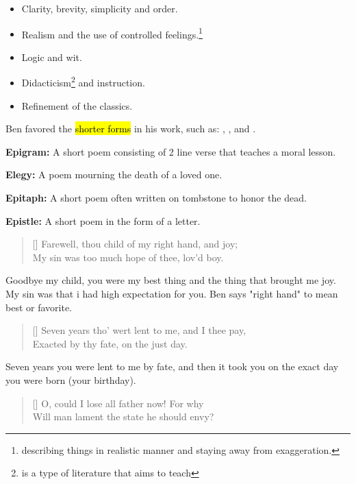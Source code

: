 
\begin{itemize}
  \item Clarity, brevity, simplicity and order.
  \item Realism and the use of controlled feelings.\footnote{describing things in realistic  manner and staying away 
    from exaggeration.}
  \item Logic and wit.
  \item Didacticism\footnote{is a type of literature that aims to teach}
    and instruction.
  \item Refinement of the classics. 
\end{itemize}


Ben favored the \hl{shorter forms} in his work, such as: 
, ,  and 
.\medbreak


\textbf{Epigram:} A short poem consisting of 2 line verse that teaches a moral lesson.\medbreak

\textbf{Elegy:} A poem mourning the death of a loved one.\medbreak

\textbf{Epitaph:} A short poem often written on tombstone
to honor the dead.\medbreak

\textbf{Epistle:} A short poem in the form of a letter.

\settowidth{\versewidth}{Farewell, thou child of my right hand, and joy}
\begin{verse}[\versewidth]
{\fontverse
Farewell, thou child of my right hand, and joy;\\
My sin was too much hope of thee, lov'd boy. 
}
\end{verse}

Goodbye my child, you were my best thing and the thing that brought me joy.
My sin was that i had high expectation for you. Ben says "right 
hand" to mean best or favorite.

\begin{verse}[\versewidth]
{\fontverse
Seven years tho' wert lent to me, and I thee pay, \\
Exacted by thy fate, on the just day. 
}
\end{verse}

Seven years you were lent to me by fate, and then it took you on the 
exact day you were born (your birthday).

\begin{verse}[\versewidth]
{\fontverse
O, could I lose all father now! For why \\
Will man lament the state he should envy? 
}
\end{verse}

